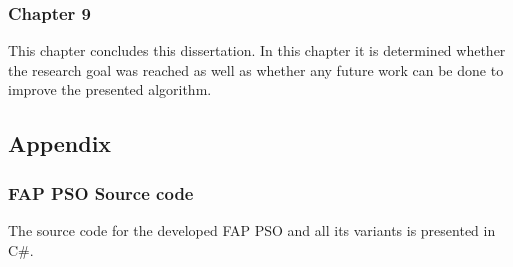 \subsubsection{Chapter 9}
This chapter concludes this dissertation. In this chapter it is determined whether the research goal was reached as well as whether any future work can be done to improve the presented algorithm.
\subsection{Appendix}
\subsubsection{FAP PSO Source code}
The source code for the developed FAP PSO and all its variants is presented in C\#.

